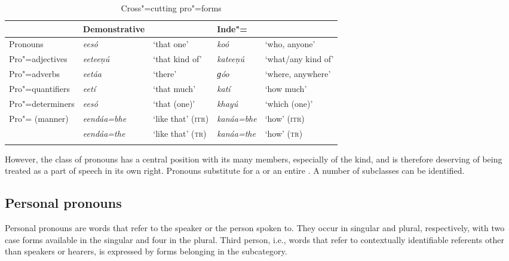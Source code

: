 \begin{table}[ht]
\caption{Cross"=cutting pro"=forms}
\begin{tabularx}{\textwidth}{ Q Q Q Q Q }
\lsptoprule
&
Demonstrative &
&
Inde"= &
\\\midrule
Pronouns &
\textit{eesó} &
`that one' &
\textit{koó} &
`who, anyone'\\
Pro"=adjectives &
\textit{eeteeṇú} &
`that kind of' &
\textit{kateeṇú} &
`what/any kind of' \\
Pro"=adverbs &
\textit{eetáa} &
`there' &
\textit{ɡóo} &
`where, anywhere' \\
Pro"=quantifiers &
\textit{eetí} &
`that much' &
\textit{katí} &
`how much' \\
Pro"=determiners &
\textit{eesó} &
`that (one)' &
\textit{khayú} &
`which (one)' \\
Pro"= (manner) &
\textit{eendáa=bhe} &
`like that' (\textsc{itr}) &
\textit{kanáa=bhe} &
`how' (\textsc{itr}) \\
&
\textit{eendáa=the} &
`like that' (\textsc{tr}) &
\textit{kanáa=the} &
`how' (\textsc{tr}) \\\lspbottomrule
\end{tabularx}
\label{tab:3b-1}
\end{table}


However, the class of pronouns has a central position with its many members, especially of the  kind, and is therefore deserving of being treated as a part of speech in its own right. Pronouns substitute for a  or an entire  . A number of subclasses can be identified.


\subsection{Personal pronouns}
\label{subsec:3b-6-1}
Personal pronouns are words that refer to the speaker or the person spoken to. They occur in singular and plural, respectively, with two case forms available in the singular and four in the plural. Third person, i.e., words that refer to contextually identifiable referents other than speakers or hearers, is expressed by forms belonging in the  subcategory.


